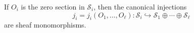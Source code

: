 If $O_i$ is the zero section in $\mathcal{S}_i$, then the canonical injections
$$
j_i = j_i(O_1, \ldots, O_\ell): \mathcal{S}_i \hookrightarrow \mathcal{S}_1 \oplus \cdots \oplus \mathcal{S}_\ell
$$
are sheaf monomorphisms.
